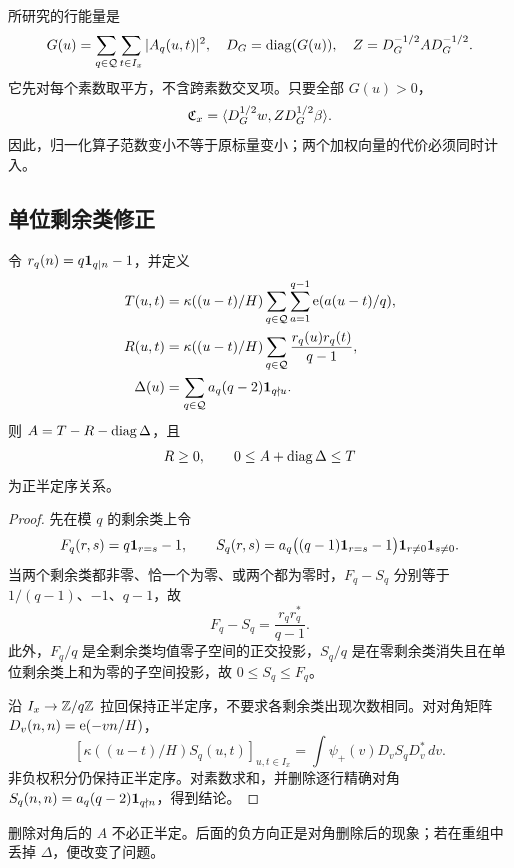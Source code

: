 所研究的行能量是
\[
G(u)=\sum_{q\in\mathcal Q}\sum_{t\in I_x}|A_q(u,t)|^2,\quad
D_G=\operatorname{diag}(G(u)),\quad Z=D_G^{-1/2}AD_G^{-1/2}.
\]
它先对每个素数取平方，不含跨素数交叉项。只要全部 $G(u)>0$，
\begin{equation}
\mathfrak C_x=\langle D_G^{1/2}w,Z D_G^{1/2}\beta\rangle.
\label{eq:readout}
\end{equation}
因此，归一化算子范数变小不等于原标量变小；两个加权向量的代价必须同时计入。

\subsection{单位剩余类修正}
\begin{proposition}[精确正形式分解]\label{prop:decomp}
令 $r_q(n)=q\mathbf 1_{q\mid n}-1$，并定义
\begin{align*}
T(u,t)&=\kappa((u-t)/H)\sum_{q\in\mathcal Q}\sum_{a=1}^{q-1}\mathrm e(a(u-t)/q),\\
R(u,t)&=\kappa((u-t)/H)\sum_{q\in\mathcal Q}\frac{r_q(u)r_q(t)}{q-1},\\
\Delta(u)&=\sum_{q\in\mathcal Q}a_q(q-2)\mathbf 1_{q\nmid u}.
\end{align*}
则 $A=T-R-\operatorname{diag}\Delta$，且
\[
R\ge0,\qquad 0\le A+\operatorname{diag}\Delta\le T
\]
为正半定序关系。
\end{proposition}
\begin{proof}
先在模 $q$ 的剩余类上令
\[
F_q(r,s)=q\mathbf 1_{r=s}-1,\qquad
S_q(r,s)=a_q\big((q-1)\mathbf 1_{r=s}-1\big)\mathbf 1_{r\ne0}\mathbf 1_{s\ne0}.
\]
当两个剩余类都非零、恰一个为零、或两个都为零时，$F_q-S_q$ 分别等于
$1/(q-1)$、$-1$、$q-1$，故
\[
F_q-S_q=\frac{r_qr_q^*}{q-1}.
\]
此外，$F_q/q$ 是全剩余类均值零子空间的正交投影，$S_q/q$ 是在零剩余类消失且在单位剩余类上和为零的子空间投影，故 $0\le S_q\le F_q$。

沿 $I_x\to\mathbb Z/q\mathbb Z$ 拉回保持正半定序，不要求各剩余类出现次数相同。对对角矩阵 $D_v(n,n)=\mathrm e(-vn/H)$，
\[
[\kappa((u-t)/H)S_q(u,t)]_{u,t\in I_x}
=\int\psi_+(v)D_vS_qD_v^*\,dv .
\]
非负权积分仍保持正半定序。对素数求和，并删除逐行精确对角
$S_q(n,n)=a_q(q-2)\mathbf 1_{q\nmid n}$，得到结论。
\end{proof}
删除对角后的 $A$ 不必正半定。后面的负方向正是对角删除后的现象；若在重组中丢掉 $\Delta$，便改变了问题。
